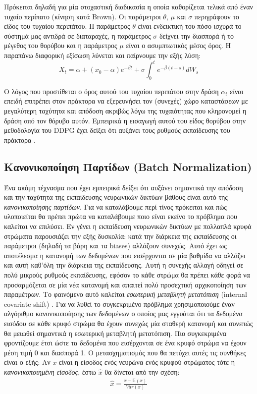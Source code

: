 \documentclass[11pt]{article} %
\numberwithin{equation}{subsection}
\begin{document}
Πρόκειται δηλαδή για μία στοχαστική διαδικασία η οποία καθορίζεται τελικά από έναν τυχαίο περίπατο (κίνηση κατά Brown). Οι παράμετροι $\theta$, $\mu$ και $\sigma$ περιγράφουν το είδος του τυχαίου περιπάτου. Η παράμετρος $\theta$ είναι ενδεικτική του πόσο ισχυρά το σύστημά μας αντιδρά σε διαταραχές, η παράμετρος $\sigma$ δείχνει την διασπορά ή το μέγεθος του θορύβου και η παράμετρος $\mu$ είναι ο ασυμπτωτικός μέσος όρος. Η παραπάνω διαφορική εξίσωση λύνεται και παίρνουμε την εξής λύση: \\
\begin{equation}
X_t = \alpha + (x_0 - \alpha) e^{-\beta t} + \sigma \int_{0}^{t} e^{-\beta (t - s)} dW_s
\end{equation}

Ο λόγος που προστίθεται ο όρος αυτού του τυχαίου περιπάτου στην δράση $\alpha_t$ είναι επειδή επιτρέπει στον πράκτορα να εξερευνήσει τον (συνεχές) χώρο καταστάσεων με μεγαλύτερη ταχύτητα και απόδοση ακριβώς λόγω της τυχαιότητας που κληρονομεί η δράση από τον θόρυβο αυτόν. Εμπειρικά η εισαγωγή αυτού του είδος θορύβου στην μεθοδολογία του DDPG έχει δείξει ότι αυξάνει τους ρυθμούς εκπαίδευσης του πράκτορα \cite{deepmind}.\\

\subsection{Κανονικοποίηση Παρτίδων (Batch Normalization)}

Ένα ακόμη τέχνασμα που έχει εμπειρικά δείξει ότι αυξάνει σημαντικά την απόδοση και την ταχύτητα της εκπαίδευσης νευρωνικών δικτύων βάθους είναι αυτό της \textit{κανονικοποίησης παρτίδων}. Για να καταλάβουμε περί τίνος πρόκειται και πώς υλοποιείται θα πρέπει πρώτα να καταλάβουμε ποιο είναι εκείνο το πρόβλημα που καλείται να επιλύσει. Εν γένει η εκπαίδευση νευρωνικών δικτύων με πολλαπλά κρυφά στρώματα παρουσιάζει την εξής δυσκολία: κατά την διάρκεια της εκπαίδευσης οι παράμετροι (δηλαδή τα βάρη και τα biases) αλλάζουν συνεχώς. Αυτό έχει ως αποτέλεσμα η κατανομή των δεδομένων που εισέρχονται σε μία βαθμίδα να αλλάζει και αυτή καθ'όλη την διάρκεια της εκπαίδευσης. Αυτή η συνεχής αλλαγή οδηγεί σε πολύ μικρούς ρυθμούς εκπαίδευσης, εφόσον το κάθε στρώμα θα πρέπει κάθε φορά να προσαρμόζεται σε μία νέα κατανομή και απαιτεί πολύ προσεχτική αρχικοποίηση των παραμέτρων. Το φαινόμενο αυτό καλείται \textit{εσωτερική μεταβλητή μετατόπιση} (internal covariate shift) \cite{batchnorm}. Για να λυθεί το συγκεκριμένο πρόβλημα χρησιμοποιούμε έναν αλγόριθμο κανονικοποίησης των δεδομένων ο οποίος μας εγγυάται ότι τα δεδομένα εισόδου σε κάθε κρυφό στρώμα θα έχουν συνεχώς μία σταθερή κατανομή και συνεπώς θα μειωθεί σημαντικά η εσωτερική μεταβλητή μετατόπιση. Πιο συγκεκριμένα φροντίζουμε έτσι ώστε τα δεδομένα που εισέρχονται σε ένα κρυφό στρώμα να έχουν μέση τιμή 0 και διασπορά 1. Ο μετασχηματισμός που θα πετύχει αυτές τις συνθήκες είναι ο εξής: Αν $x$ είναι η είσοδος ενός νευρώνα ενός κρυφού στρώματος τότε η \textit{κανονικοποιημένη είσοδος}, έστω $\hat{x}$ θα δίνεται από την σχέση:\\
\begin{align*}
\hat{x} = \frac{x - \mathbb{E}(x)}{Var(x)}
\end{align*}
\end{document}
